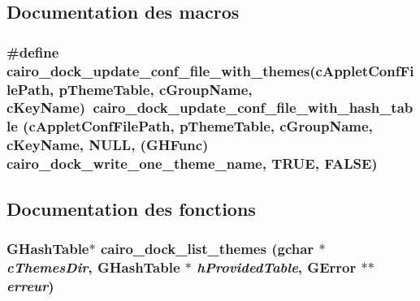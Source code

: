 \subsection{Documentation des macros}
\subsubsection{\setlength{\rightskip}{0pt plus 5cm}\#define cairo\_\-dock\_\-update\_\-conf\_\-file\_\-with\_\-themes(cAppletConfFilePath, pThemeTable, cGroupName, cKeyName)~cairo\_\-dock\_\-update\_\-conf\_\-file\_\-with\_\-hash\_\-table (cAppletConfFilePath, pThemeTable, cGroupName, cKeyName, NULL, (GHFunc) cairo\_\-dock\_\-write\_\-one\_\-theme\_\-name, TRUE, FALSE)}\label{cairo-dock-themes-manager_8h_210b7e065022a4749aec1ff8a3333cb3}




\subsection{Documentation des fonctions}
\subsubsection{\setlength{\rightskip}{0pt plus 5cm}GHashTable$\ast$ cairo\_\-dock\_\-list\_\-themes (gchar $\ast$ {\em cThemesDir}, GHashTable $\ast$ {\em hProvidedTable}, GError $\ast$$\ast$ {\em erreur})}\label{cairo-dock-themes-manager_8h_f2b87f4aad180d5e5368088bdb05240b}


